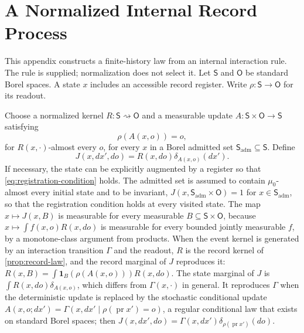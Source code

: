 \chapter{A Normalized Internal Record Process}
\label{app:records}

This appendix constructs a finite-history law from an internal interaction rule. The rule is supplied; normalization does not select it. Let $\mathsf S$ and $\mathsf O$ be standard Borel spaces. A state $x$ includes an accessible record register. Write $\rho:\mathsf S\to\mathsf O$ for its readout.

Choose a normalized kernel $R:\mathsf S\rightsquigarrow\mathsf O$ and a measurable update $A:\mathsf S\times\mathsf O\to\mathsf S$ satisfying
\begin{equation}
\rho(A(x,o))=o,
\label{eq:registration-condition}
\end{equation}
for $R(x,\cdot)$-almost every $o$, for every $x$ in a Borel admitted set $\mathsf S_{\mathrm{adm}}\subseteq\mathsf S$. Define
\begin{equation}
J(x,dx',do)=R(x,do)\delta_{A(x,o)}(dx').
\label{eq:registered-transition}
\end{equation}
If necessary, the state can be explicitly augmented by a register so that \cref{eq:registration-condition} holds. The admitted set is assumed to contain $\mu_0$-almost every initial state and to be invariant, $J(x,\mathsf S_{\mathrm{adm}}\times\mathsf O)=1$ for $x\in\mathsf S_{\mathrm{adm}}$, so that the registration condition holds at every visited state. The map $x\mapsto J(x,B)$ is measurable for every measurable $B\subseteq\mathsf S\times\mathsf O$, because $x\mapsto\int f(x,o)R(x,do)$ is measurable for every bounded jointly measurable $f$, by a monotone-class argument from products. When the event kernel is generated by an interaction transition $\Gamma$ and the readout, $R$ is the record kernel of \cref{prop:record-law}, and the record marginal of $J$ reproduces it: $R(x,B)=\int\mathbf 1_B(\rho(A(x,o)))R(x,do)$. The state marginal of $J$ is $\int R(x,do)\delta_{A(x,o)}$, which differs from $\Gamma(x,\cdot)$ in general. It reproduces $\Gamma$ when the deterministic update is replaced by the stochastic conditional update $A(x,o;dx')=\Gamma(x,dx'\mid\rho(\operatorname{pr}x')=o)$, a regular conditional law that exists on standard Borel spaces; then $J(x,dx',do)=\Gamma(x,dx')\delta_{\rho(\operatorname{pr}x')}(do)$.

